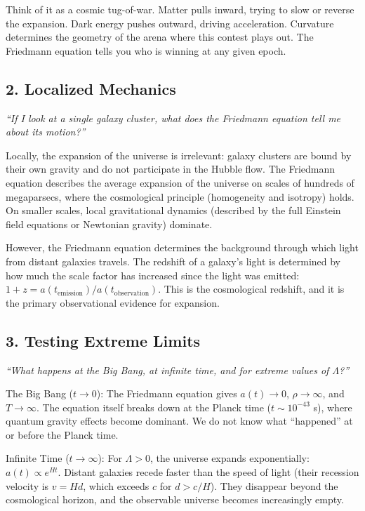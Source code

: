Think of it as a cosmic tug-of-war. Matter pulls inward, trying to slow or reverse the expansion. Dark energy pushes outward, driving acceleration. Curvature determines the geometry of the arena where this contest plays out. The Friedmann equation tells you who is winning at any given epoch.

\subsection*{2. Localized Mechanics}
\textit{``If I look at a single galaxy cluster, what does the Friedmann equation tell me about its motion?''}

Locally, the expansion of the universe is irrelevant: galaxy clusters are bound by their own gravity and do not participate in the Hubble flow. The Friedmann equation describes the average expansion of the universe on scales of hundreds of megaparsecs, where the cosmological principle (homogeneity and isotropy) holds. On smaller scales, local gravitational dynamics (described by the full Einstein field equations or Newtonian gravity) dominate.

However, the Friedmann equation determines the background through which light from distant galaxies travels. The redshift of a galaxy's light is determined by how much the scale factor has increased since the light was emitted: $1 + z = a(t_{\text{emission}})/a(t_{\text{observation}})$. This is the cosmological redshift, and it is the primary observational evidence for expansion.

\subsection*{3. Testing Extreme Limits}
\textit{``What happens at the Big Bang, at infinite time, and for extreme values of $\Lambda$?''}

The Big Bang ($t \to 0$): The Friedmann equation gives $a(t) \to 0$, $\rho \to \infty$, and $T \to \infty$. The equation itself breaks down at the Planck time ($t \sim 10^{-43}$ s), where quantum gravity effects become dominant. We do not know what ``happened'' at or before the Planck time.

Infinite Time ($t \to \infty$): For $\Lambda > 0$, the universe expands exponentially: $a(t) \propto e^{Ht}$. Distant galaxies recede faster than the speed of light (their recession velocity is $v = H d$, which exceeds $c$ for $d > c/H$). They disappear beyond the cosmological horizon, and the observable universe becomes increasingly empty.

